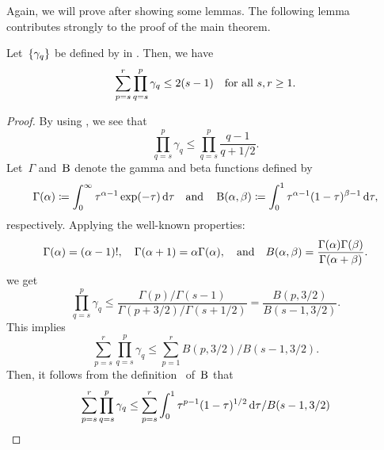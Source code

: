 \documentclass[../main]{subfiles}
\begin{document}
Again, we will prove  after showing some lemmas.
The following lemma contributes strongly to the proof of the main theorem.
\begin{lemma} 
    Let~$\set*{\gamma_q}$ be defined by  in .
    Then, we have
    \begin{equation}
        \sum_{p = s}^r \prod_{q = s}^p \gamma_q \le 2 ( s - 1) \forallcondition{s, r \ge 1}
    .\end{equation} 
\end{lemma}
\begin{proof}
    By using , we see that
    \begin{equation}
        \prod_{q = s}^{p} \gamma_q \le \prod_{q = s}^{p} \frac{q - 1}{q + 1 / 2} 
    .\end{equation}
    Let~$\Gamma$ and~$\Beta$ denote the gamma and beta functions defined by
    \begin{equation} \label{eq:gamma and beta}
        \Gamma(\alpha) \coloneqq \int_{0}^{\infty} \tau^{\alpha - 1} \exp(-\tau) \odif{\tau} \eqand
        \Beta(\alpha, \beta) \coloneqq \int_{0}^{1} \tau^{\alpha - 1} (1 - \tau)^{\beta - 1} \odif{\tau}
    ,\end{equation}
    respectively.
    Applying the well-known properties:
    \begin{equation} \label{eq:gamma and beta properties}
        \Gamma(\alpha) = (\alpha - 1)!, \quad \Gamma(\alpha + 1) = \alpha \Gamma(\alpha), \eqand B(\alpha, \beta) = \frac{\Gamma(\alpha) \Gamma(\beta)}{\Gamma(\alpha + \beta)}
    .\end{equation}
    we get
    \begin{equation}
        \prod_{q = s}^{p} \gamma_q \le \frac{\Gamma(p) / \Gamma(s - 1)}{\Gamma(p + 3 / 2) / \Gamma(s + 1 / 2)}
        = \frac{B(p, 3 / 2)}{B(s - 1, 3 / 2)}
    .\end{equation} 
    This implies
    \begin{equation}
        \sum_{p = s}^{r} \prod_{q = s}^{p} \gamma_q \le \sum_{p = 1}^{r} B(p, 3 / 2) / B(s - 1, 3 / 2)
    .\end{equation} 
    Then, it follows from the definition~ of~$\Beta$ that
    \begin{equation}
        \begin{split}
            \sum_{p = s}^{r} \prod_{q = s}^{p} \gamma_q 
        &\le \sum_{p = s}^{r} \int_{0}^{1} \tau^{p - 1} (1 - \tau)^{1 / 2} \odif{\tau} / B(s - 1, 3 / 2) \\

\end{split}
\end{equation}
\end{proof}
\end{document}
